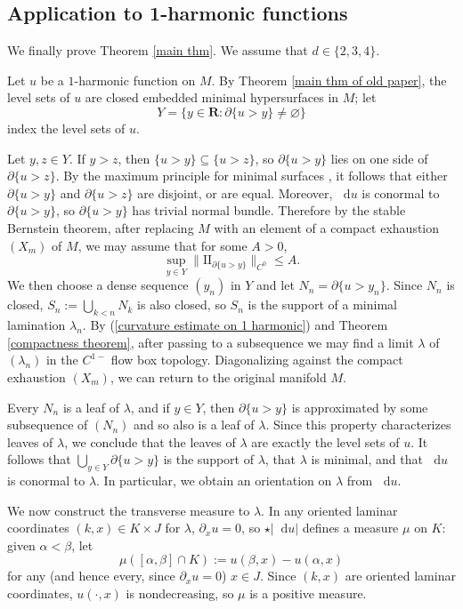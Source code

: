 \documentclass[final,12pt, leqno]{brownthesis}
\let\emptyset\varnothing
\newcommand{\RR}{\mathbf{R}}
\newcommand*\dif{\mathop{}\!\mathrm{d}}
\newcommand{\Two}{\mathrm{I\!I}}
\theoremstyle{definition}
\numberwithin{equation}{section}
\begin{document}
\subsection{Application to 1-harmonic functions}
We finally prove Theorem \ref{main thm}.
We assume that $d \in \{2, 3, 4\}$.

Let $u$ be a $1$-harmonic function on $M$.
By Theorem \ref{main thm of old paper}, the level sets of $u$ are closed embedded minimal hypersurfaces in $M$; let
$$Y = \{y \in \RR: \partial \{u > y\} \neq \emptyset\}$$
index the level sets of $u$.

Let $y, z \in Y$. If $y > z$, then $\{u > y\} \subseteq \{u > z\}$, so $\partial \{u > y\}$ lies on one side of $\partial \{u > z\}$.
By the maximum principle for minimal surfaces \cite[Corollary 1.28]{colding2011course}, it follows that either $\partial \{u > y\}$ and $\partial \{u > z\}$ are disjoint, or are equal.
Moreover, $\dif u$ is conormal to $\partial \{u > y\}$, so $\partial \{u > y\}$ has trivial normal bundle.
Therefore by the stable Bernstein theorem, after replacing $M$ with an element of a compact exhaustion $(X_m)$ of $M$, we may assume that for some $A > 0$,
\begin{equation}\label{curvature estimate on 1 harmonic}
	\sup_{y \in Y} \|\Two_{\partial \{u > y\}}\|_{C^0} \leq A.
\end{equation}
We then choose a dense sequence $(y_n)$ in $Y$ and let $N_n = \partial \{u > y_n\}$.
Since $N_n$ is closed, $S_n := \bigcup_{k < n} N_k$ is also closed, so $S_n$ is the support of a minimal lamination $\lambda_n$.
By (\ref{curvature estimate on 1 harmonic}) and Theorem \ref{compactness theorem}, after passing to a subsequence we may find a limit $\lambda$ of $(\lambda_n)$ in the $C^{1-}$ flow box topology.
Diagonalizing against the compact exhaustion $(X_m)$, we can return to the original manifold $M$.

Every $N_n$ is a leaf of $\lambda$, and if $y \in Y$, then $\partial \{u > y\}$ is approximated by some subsequence of $(N_n)$ and so also is a leaf of $\lambda$.
Since this property characterizes leaves of $\lambda$, we conclude that the leaves of $\lambda$ are exactly the level sets of $u$.
It follows that $\bigcup_{y \in Y} \partial \{u > y\}$ is the support of $\lambda$, that $\lambda$ is minimal, and that $\dif u$ is conormal to $\lambda$.
In particular, we obtain an orientation on $\lambda$ from $\dif u$.

We now construct the transverse measure to $\lambda$.
In any oriented laminar coordinates $(k, x) \in K \times J$ for $\lambda$, $\partial_x u = 0$, so $\star |\dif u|$ defines a measure $\mu$ on $K$: given $\alpha < \beta$, let
$$\mu([\alpha, \beta] \cap K) := u(\beta, x) - u(\alpha, x)$$
for any (and hence every, since $\partial_x u = 0$) $x \in J$.
Since $(k, x)$ are oriented laminar coordinates, $u(\cdot, x)$ is nondecreasing, so $\mu$ is a positive measure.
\end{document}
